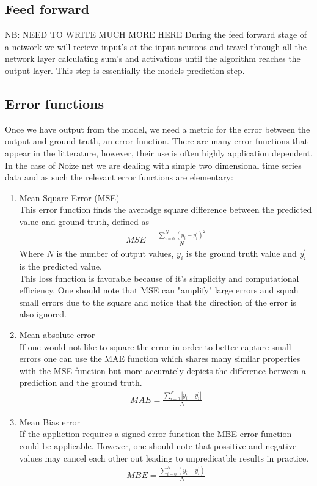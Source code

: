 \documentclass{article}
\begin{document}
\label{sec:activationfuncs}

\subsection{Feed forward}
\label{sec:forward}
NB: NEED TO WRITE MUCH MORE HERE
During the feed forward stage of a network we will recieve input's at the input neurons and travel through all the network layer calculating sum's and activations until the algorithm reaches the output layer. This step is essentially the models prediction step.
\subsection{Error functions}
\label{sec:error}
Once we have output from the model, we need a metric for the error between the output and ground truth, an error function. There are many error functions that appear in the litterature, however, their use is often highly application dependent. In the case of Noize net we are dealing with simple two dimensional time series data and as such the relevant error functions are elementary:
\begin{enumerate}
\item Mean Square Error (MSE)\\
This error function finds the averadge square difference between the predicted value and ground truth, defined as
\begin{align*}
MSE = \frac{\sum_{i=0}^N (y_i - y_i^\prime)^2}{N}
\end{align*}
Where $N$ is the number of output values, $y_i$ is the ground truth value and $y_i^\prime$ is the predicted value. \\
This loss function is favorable because of it's simplicity and computational efficiency. One should note that MSE can "amplify" large errors and squah small errors due to the square and notice that the direction of the error is also ignored.  
\item Mean absolute error \\
If one would not like to square the error in order to better capture small errors one can use the MAE function which shares many similar properties with the MSE function but more accurately depicts the difference between a prediction and the ground truth. 
\begin{align*}
MAE = \frac{\sum_{i=0}^N |y_i - y_i^\prime|}{N}
\end{align*}
\item Mean Bias error \\
If the appliction requires a signed error function the MBE error function could be applicable. However, one should note that possitive and negative values may cancel each other out leading to unpredicatble results in practice. 
\begin{align*}
MBE = \frac{\sum_{i=0}^N (y_i - y_i^\prime)}{N}
\end{align*}
\end{enumerate}
\end{document}
